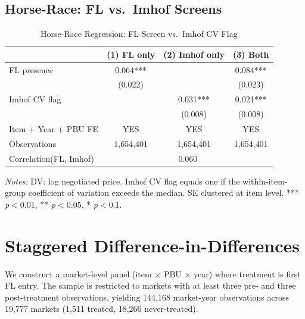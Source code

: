 \subsection{Horse-Race: FL vs.\ Imhof Screens}

\begin{table}[htbp]
\centering
\caption{Horse-Race Regression: FL Screen vs.\ Imhof CV Flag}
\label{tab:horse_race}
\begin{threeparttable}
\small
\begin{tabular}{lccc}
\toprule
 & (1) FL only & (2) Imhof only & (3) Both \\
\midrule
FL presence & 0.064*** &  & 0.084*** \\
 & (0.022) &  & (0.023) \\
Imhof CV flag &  & 0.031*** & 0.021*** \\
 &  & (0.008) & (0.008) \\
\midrule
Item + Year + PBU FE & YES & YES & YES \\
Observations & 1{,}654{,}401 & 1{,}654{,}401 & 1{,}654{,}401 \\
Correlation(FL, Imhof) & \multicolumn{3}{c}{0.060} \\
\bottomrule
\end{tabular}
\begin{tablenotes}
\small
\item \textit{Notes:} DV: log negotiated price. Imhof CV flag equals one
if the within-item-group coefficient of variation exceeds the median.
SE clustered at item level.
*** \textit{p}$<$0.01, ** \textit{p}$<$0.05, * \textit{p}$<$0.1.
\end{tablenotes}
\end{threeparttable}
\end{table}

\section{Staggered Difference-in-Differences}
\label{app:did}

We construct a market-level panel (item $\times$ PBU $\times$ year)
where treatment is first FL entry. The sample is restricted to markets
with at least three pre- and three post-treatment observations, yielding
144,168 market-year observations across 19,777 markets (1,511 treated,
18,266 never-treated).



